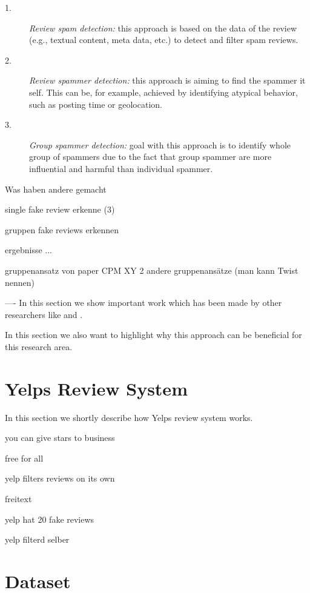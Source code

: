 \documentclass[conference]{IEEEtran}  %
\theoremstyle{plain}
\theoremstyle{definition}
\theoremstyle{remark}
\begin{document}
\begin{description}
\item[1.]
\textit{Review spam detection:} this approach is based on the data of the review (e.g., textual content, meta data, etc.) to detect and filter spam reviews. \cite {cardoso2018review, harris2012deceptive, ott-etal-2011-finding} 
\item[2.]  
\textit{Review spammer detection:} this approach is aiming to find the spammer it self. This can be, for example, achieved by identifying atypical behavior, such as posting time or geolocation. \cite {mukherjee2013spotting, fei2013spammer, li2015pattern}
\item[3.]
\textit{Group spammer detection:} goal with this approach is to identify whole group of spammers due to the fact that group spammer are more influential and harmful than individual spammer.  \cite {choo2015detecting, mukherjee2012groups, xu2019cpm}

\end{description}

Was haben andere gemacht

single fake review erkenne (3)

gruppen fake reviews erkennen

ergebnisse ...

gruppenansatz von paper CPM XY
2 andere gruppenansätze
(man kann Twist nennen)


----
In this section we show important work which has been made by other researchers like 
\cite{mukherjee2013spotting} and \cite{choo2015detecting}.

In this section we also want to highlight why this approach can be beneficial for this research area. 

\section{Yelps Review System}
\label{sec:Yelps review_system}

In this section we shortly describe how Yelps review system works. 

you can give stars to business

free for all

yelp filters reviews on its own

freitext

yelp hat 20 fake reviews

yelp filterd selber


\section{Dataset}
\label{sec:dataset}
\end{document}
